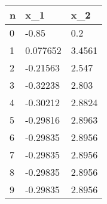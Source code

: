 \begin{tabular}{lll}
n & x_{1} & x_{2} \\ 
\hline 
0 & -0.85 & 0.2 \\ 
1 & 0.077652 & 3.4561 \\ 
2 & -0.21563 & 2.547 \\ 
3 & -0.32238 & 2.803 \\ 
4 & -0.30212 & 2.8824 \\ 
5 & -0.29816 & 2.8963 \\ 
6 & -0.29835 & 2.8956 \\ 
7 & -0.29835 & 2.8956 \\ 
8 & -0.29835 & 2.8956 \\ 
9 & -0.29835 & 2.8956 \\ 
\hline 
\end{tabular}